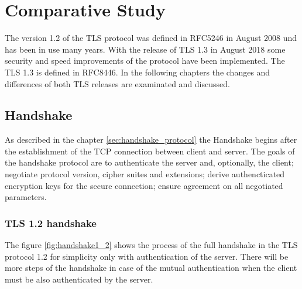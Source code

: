 \chapter{Comparative Study}
\label{chap:comparative_study}

The version 1.2 of the TLS protocol was defined in RFC5246 in August 2008 und has been in use many years. With the release of TLS 1.3 in August 2018 some security and speed improvements of the protocol have been implemented. The TLS 1.3 is defined in RFC8446. In the following chapters the changes and differences of both TLS releases are examinated and discussed.

\section{Handshake}
\label{sec:comparison_handshake}

As described in the chapter \ref{sec:handshake_protocol} the Handshake begins after the establishment of the TCP connection between client and server. The goals of the handshake protocol are to authenticate the server and, optionally, the client; negotiate protocol version, cipher suites and extensions; derive authencticated encryption keys for the secure connection; ensure agreement on all negotiated parameters. \cite{Hassenstein}

\subsection{TLS 1.2 handshake}
\label{subsec:handshake1_2}

The figure \ref{fig:handshake1_2} shows the process of the full handshake in the TLS protocol 1.2 for simplicity only with authentication of the server. There will be more steps of the handshake in case of the mutual authentication when the client must be also authenticated by the server.


